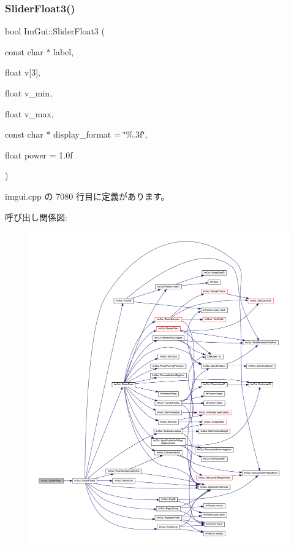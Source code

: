 \subsubsection{\texorpdfstring{Slider\+Float3()}{SliderFloat3()}}
{\footnotesize\ttfamily bool Im\+Gui\+::\+Slider\+Float3 (\begin{DoxyParamCaption}\item[{const char $\ast$}]{label,  }\item[{float}]{v\mbox{[}3\mbox{]},  }\item[{float}]{v\+\_\+min,  }\item[{float}]{v\+\_\+max,  }\item[{const char $\ast$}]{display\+\_\+format = {\ttfamily \char`\"{}\%.3f\char`\"{}},  }\item[{float}]{power = {\ttfamily 1.0f} }\end{DoxyParamCaption})}



 imgui.\+cpp の 7080 行目に定義があります。

呼び出し関係図\+:\nopagebreak
\begin{figure}[H]
\begin{center}
\leavevmode
\includegraphics[width=350pt]{namespace_im_gui_aab33732d7951627f9c32d708f263889f_cgraph}
\end{center}
\end{figure}
\mbox{\label{namespace_im_gui_aab6b7e99cab3975fece12fb1cd56e281}} 
